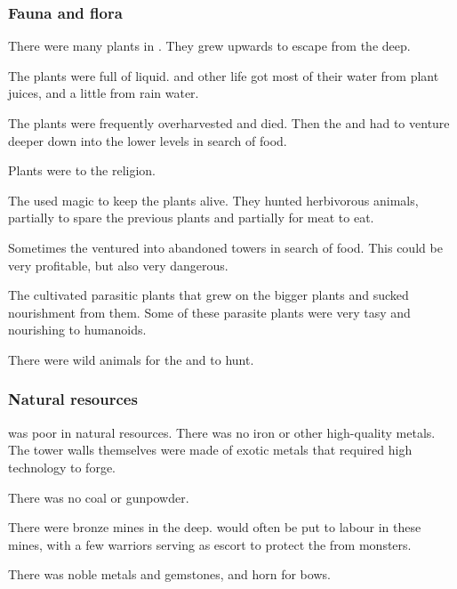 \subsubsection{Fauna and flora}
There were many plants in \Nyx. 
They grew upwards to escape from the deep. 

The plants were full of liquid. 
\Resphain and other \Nyxian life got most of their water from plant juices, and a little from rain water.

The plants were frequently overharvested and died. 
Then the \resphain and \humans had to venture deeper down into the lower levels in search of food. 

Plants were  to the \Merkyran religion. 

The \resphain used magic to keep the plants alive.
They hunted herbivorous animals, partially to spare the previous plants and partially for meat to eat. 

Sometimes the \resphain ventured into abandoned towers in search of food. 
This could be very profitable, but also very dangerous.

The \resphain cultivated parasitic plants that grew on the bigger plants and sucked nourishment from them.
Some of these parasite plants were very tasy and nourishing to humanoids.

There were wild animals for the \resphain and \humans to hunt. 





\subsubsection{Natural resources}
\Nyx was poor in natural resources. 
There was no iron or other high-quality metals.
The tower walls themselves were made of exotic metals that required high technology to forge.

There was no coal or gunpowder.

There were bronze mines in the deep. 
\Humans would often be put to labour in these mines, with a few \resphan warriors serving as escort to protect the \humans from monsters.

There was noble metals and gemstones, and horn for bows. 









